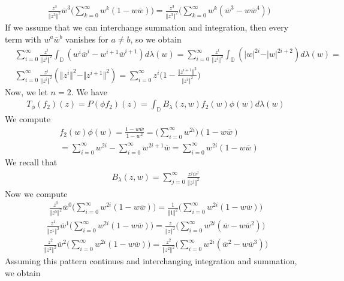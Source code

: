\documentclass[12pt]{article}
\begin{document}
\begin{align}
&\frac{z^3}{\Vert z^3 \Vert^2} \overline{w}^3 \Bigg( \sum_{k=0}^\infty w^k(1- w\overline{w}) \Bigg) = \frac{z^3}{\Vert z^3 \Vert^2} \Bigg( \sum_{k=0}^\infty w^k(\overline{w}^3- w\overline{w}^4) \Bigg)
\end{align}
If we assume that we can interchange summation and integration, then every term with $w^a\overline{w}^b$ vanishes for $a \neq b$, so we obtain
\begin{align}
& \sum_{i = 0}^\infty \frac{z^i}{\Vert z^i \Vert^2} \int_\mathbb{D} (w^i\overline{w}^i - w^{i+1}\overline{w}^{i+1}) d\lambda(w) = \sum_{i=0}^\infty \frac{z^i}{\Vert z^i \Vert^2} \int_\mathbb{D} (\vert w\vert^{2i} - \vert w \vert^{2i+2}) d\lambda(w) = \\
& \sum_{i=0}^\infty \frac{z^i}{\Vert z^i \Vert^2} (\Vert z^i \Vert^2 - \Vert z^{i+1} \Vert^2) = \sum_{i=0}^\infty z^i\bigg(1 - \frac{\Vert z^{i+1} \Vert^2}{\Vert z^i \Vert^2}\bigg)
\end{align} Now, we let $n = 2$. We have
\begin{align}
T_\phi(f_2)(z) = P(\phi f_2)(z) = \int_\mathbb{D} B_\lambda(z,w) f_2(w) \phi(w) d\lambda(w)
\end{align} We compute 
\begin{align}
&f_2(w) \phi(w) = \frac{1 - w\overline{w}}{1-w^2} = \Bigg(\sum_{i=0}^\infty w^{2i}\Bigg)(1 - w \overline{w}) \\
& = \sum_{i=0}^\infty w^{2i} - \sum_{i=0}^\infty w^{2i+1}\overline{w} = \sum_{i=0}^\infty w^{2i}(1-w\overline{w})
\end{align} We recall that
\begin{align}
B_\lambda(z,w) = \sum_{j=0}^\infty \frac{z^j \overline{w}^j}{\Vert z^j \Vert^2}
\end{align} Now we compute
\begin{align}
\frac{z^0}{\Vert z^0 \Vert^2}\overline{w}^0\Bigg(\sum_{i=0}^\infty w^{2i}(1-w\overline{w})\Bigg) = \frac{1}{\Vert 1 \Vert^2} \Bigg(\sum_{i=0}^\infty w^{2i}(1-w\overline{w})\Bigg)
\end{align}
\begin{align}
\frac{z^1}{\Vert z^1 \Vert^2} \overline{w}^1 \bigg(\sum_{i=0}^\infty w^{2i}(1-w\overline{w})\bigg) = \frac{z}{\Vert z \Vert^2} \bigg(\sum_{i=0}^\infty w^{2i}(\overline{w}-w\overline{w}^2)\bigg)
\end{align}
\begin{align}
\frac{z^2}{\Vert z^2 \Vert^2} \overline{w}^2 \Bigg(\sum_{i=0}^\infty w^{2i}(1-w\overline{w})\Bigg) = \frac{z^2}{\Vert z^2 \Vert^2}  \Bigg(\sum_{i=0}^\infty w^{2i}(\overline{w}^2-w\overline{w}^3)\Bigg)
\end{align} Assuming this pattern continues and interchanging integration and summation, we obtain
\end{document}
